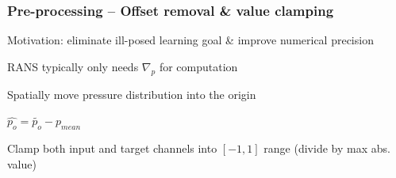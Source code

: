 \begin{frame}
    \frametitle{Pre-processing -- Offset removal \& value clamping}
\vspace*{0.8cm}
Motivation: eliminate ill-posed learning goal \& improve numerical precision

\begin{PraesentationAufzaehlung}
\item RANS typically only needs $\nabla_{p}$ for computation
\item Spatially move pressure distribution into the origin
\item $\hat{p_o} = \tilde{p_o} - p_{mean}$ 
\item Clamp both input and target channels into $[-1, 1]$ range (divide by max abs. value)
\end{PraesentationAufzaehlung}
\end{frame}
\clearpage
